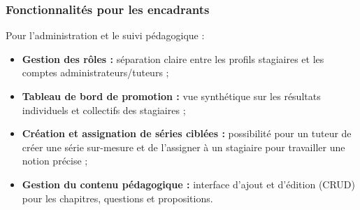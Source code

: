 \documentclass{tnreport}
\begin{document}
\subsubsection{Fonctionnalités pour les encadrants}
Pour l'administration et le suivi pédagogique :
\begin{itemize}
    \item \textbf{Gestion des rôles :} séparation claire entre les profils stagiaires et les comptes administrateurs/tuteurs ;
    \item \textbf{Tableau de bord de promotion :} vue synthétique sur les résultats individuels et collectifs des stagiaires ;
    \item \textbf{Création et assignation de séries ciblées :} possibilité pour un tuteur de créer une série sur-mesure et de l'assigner à un stagiaire pour travailler une notion précise ;
    \item \textbf{Gestion du contenu pédagogique :} interface d'ajout et d'édition (CRUD) pour les chapitres, questions et propositions.
\end{itemize}
\end{document}
